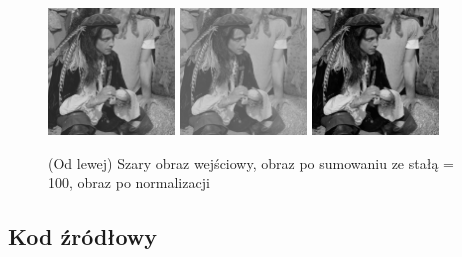 \documentclass[final,a4paper,openany,12pt]{mwbk}
\begin{document}
\begin{figure}[H]
	\begin{center}
		\includegraphics[width=0.3\textwidth]{2/2Gray_Const_Sum_Original}
		\includegraphics[width=0.3\textwidth]{2/2Gray_Const_Sum_Result}
		\includegraphics[width=0.3\textwidth]{2/2Gray_Const_Sum_Result_Norm}
	\end{center}
	\caption{(Od lewej) Szary obraz wejściowy, obraz po sumowaniu ze stałą = 100, obraz po normalizacji }
\end{figure}

\subsection*{Kod źródłowy}
\end{document}
